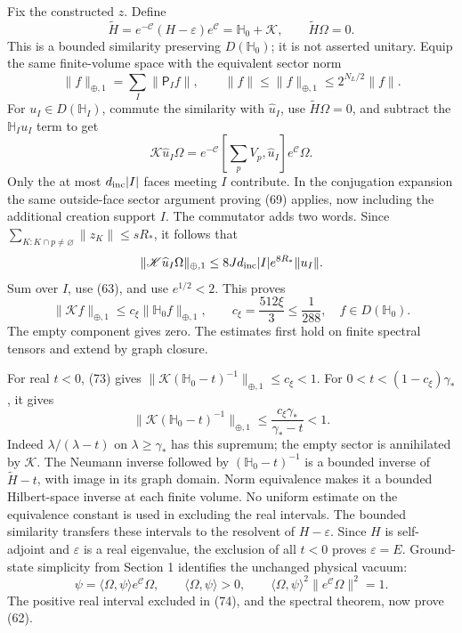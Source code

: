 \documentclass[
  11pt,
]{article}
\begin{document}
Fix the constructed \(z\). Define \[
 \widetilde H=e^{-\mathscr C}(H-\varepsilon)e^{\mathscr C}
       =\mathbb H_0+\mathscr K,\qquad \widetilde H\Omega=0 .
\] This is a bounded similarity preserving \(D(\mathbb H_0)\); it is not
asserted unitary. Equip the same finite-volume space with the equivalent
sector norm \[
 \|f\|_{\oplus,1}=\sum_I\|\mathsf P_If\|,\qquad
 \|f\|\le\|f\|_{\oplus,1}\le2^{N_L/2}\|f\| .
\] For \(u_I\in D(\mathbb H_I)\), commute the similarity with
\(\widehat u_I\), use \(\widetilde H\Omega=0\), and subtract the
\(\mathbb H_Iu_I\) term to get \[
 \mathscr K\widehat u_I\Omega
 =e^{-\mathscr C}\left[\sum_pV_p,\widehat u_I\right]
       e^{\mathscr C}\Omega .
\] Only the at most \(d_{\rm inc}|I|\) faces meeting \(I\) contribute.
In the conjugation expansion the same outside-face sector argument
proving (69) applies, now including the additional creation support
\(I\). The commutator adds two words. Since
\(\sum_{K:K\cap p\ne\varnothing}\|z_K\|\le sR_*\), it follows that \[
 \|\mathscr K\widehat u_I\Omega\|_{\oplus,1}
 \le8Jd_{\rm inc}|I|e^{8R_*}\|u_I\| .
\] Sum over \(I\), use (63), and use \(e^{1/2}<2\). This proves \[
 \|\mathscr Kf\|_{\oplus,1}
 \le c_\xi\|\mathbb H_0f\|_{\oplus,1},\qquad
 c_\xi=\frac{512\xi}{3}\le\frac1{288},
 \quad f\in D(\mathbb H_0).
 \tag{73}
\] The empty component gives zero. The estimates first hold on finite
spectral tensors and extend by graph closure.

For real \(t<0\), (73) gives
\(\|\mathscr K(\mathbb H_0-t)^{-1}\|_{\oplus,1}\le c_\xi<1\). For
\(0<t<(1-c_\xi)\gamma_*\), it gives \[
 \|\mathscr K(\mathbb H_0-t)^{-1}\|_{\oplus,1}
 \le\frac{c_\xi\gamma_*}{\gamma_*-t}<1 .
 \tag{74}
\] Indeed \(\lambda/(\lambda-t)\) on \(\lambda\ge\gamma_*\) has this
supremum; the empty sector is annihilated by \(\mathscr K\). The Neumann
inverse followed by \((\mathbb H_0-t)^{-1}\) is a bounded inverse of
\(\widetilde H-t\), with image in its graph domain. Norm equivalence
makes it a bounded Hilbert-space inverse at each finite volume. No
uniform estimate on the equivalence constant is used in excluding the
real intervals. The bounded similarity transfers these intervals to the
resolvent of \(H-\varepsilon\). Since \(H\) is self-adjoint and
\(\varepsilon\) is a real eigenvalue, the exclusion of all \(t<0\)
proves \(\varepsilon=E\). Ground-state simplicity from Section 1
identifies the unchanged physical vacuum: \[
 \psi=\langle\Omega,\psi\rangle e^{\mathscr C}\Omega,\qquad
 \langle\Omega,\psi\rangle>0,\qquad
 \langle\Omega,\psi\rangle^2\|e^{\mathscr C}\Omega\|^2=1 .
 \tag{75}
\] The positive real interval excluded in (74), and the spectral
theorem, now prove (62).
\end{document}
